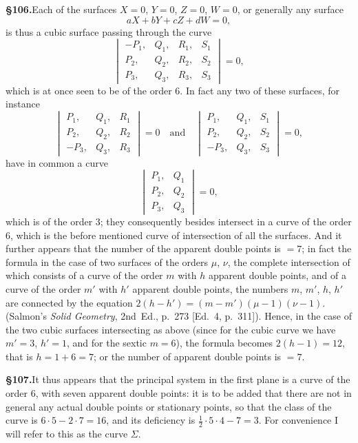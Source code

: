 \documentclass[11pt,a4paper]{article}
\begin{document}
\textbf{\S 106.}\quad Each of the surfaces $X = 0$, $Y = 0$, $Z = 0$, $W = 0$, or generally any surface
\[
aX + bY + cZ + dW = 0,
\]
is thus a cubic surface passing through the curve
\[
\begin{vmatrix}
-P_1, & Q_1, & R_1, & S_1 \\
P_2, & Q_2, & R_2, & S_2 \\
P_3, & Q_3, & R_3, & S_3
\end{vmatrix} = 0,
\]
which is at once seen to be of the order 6. In fact any two of these surfaces, for instance
\[
\begin{vmatrix}
P_1, & Q_1, & R_1 \\
P_2, & Q_2, & R_2 \\
-P_3, & Q_3, & R_3
\end{vmatrix} = 0
\quad\text{and}\quad
\begin{vmatrix}
P_1, & Q_1, & S_1 \\
P_2, & Q_2, & S_2 \\
-P_3, & Q_3, & S_3
\end{vmatrix} = 0,
\]
have in common a curve
\[
\begin{vmatrix}
P_1, & Q_1 \\
P_2, & Q_2 \\
P_3, & Q_3
\end{vmatrix} = 0,
\]
which is of the order 3; they consequently besides intersect in a curve of the order 6, which is the before mentioned curve of intersection of all the surfaces. And it further appears that the number of the apparent double points is $= 7$; in fact the formula in the case of two surfaces of the orders $\mu$, $\nu$, the complete intersection of which consists of a curve of the order $m$ with $h$ apparent double points, and of a curve of the order $m'$ with $h'$ apparent double points, the numbers $m$, $m'$, $h$, $h'$ are connected by the equation $2(h - h') = (m - m')(\mu - 1)(\nu - 1)$. (Salmon's \textit{Solid Geometry}, 2nd~Ed., p.~273 [Ed.~4, p.~311]). Hence, in the case of the two cubic surfaces intersecting as above (since for the cubic curve we have $m' = 3$, $h' = 1$, and for the sextic $m = 6$), the formula becomes $2(h - 1) = 12$, that is $h = 1 + 6 = 7$; or the number of apparent double points is $= 7$.

\textbf{\S 107.}\quad It thus appears that the principal system in the first plane is a curve of the order 6, with seven apparent double points: it is to be added that there are not in general any actual double points or stationary points, so that the class of the curve is $6 \cdot 5 - 2 \cdot 7 = 16$, and its deficiency is $\frac{1}{2} \cdot 5 \cdot 4 - 7 = 3$. For convenience I will refer to this as the curve $\Sigma$.
\end{document}
